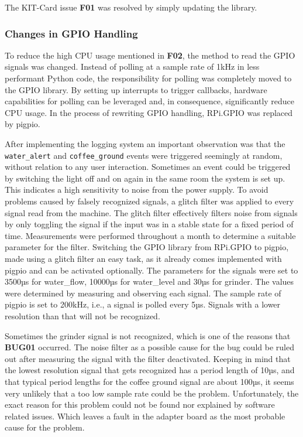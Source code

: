 \documentclass[12pt]{article}
\begin{document}
The KIT-Card issue \textbf{F01} was resolved by simply updating the library.


\subsubsection{Changes in GPIO Handling}
\label{sec:cpu-usage}
To reduce the high CPU usage mentioned in \textbf{F02},
the method to read the GPIO signals was changed.
Instead of polling at a sample rate of 1kHz in less performant Python code,
the responsibility for polling was completely moved to the GPIO library.
By setting up interrupts to trigger callbacks,
hardware capabilities for polling can be leveraged and, in consequence, significantly reduce CPU usage.
In the process of rewriting GPIO handling, RPi.GPIO was replaced by pigpio.

After implementing the logging system an important observation was that the \\
\texttt{water\_alert} and \texttt{coffee\_ground} events were triggered seemingly at random, without relation to any user interaction.
Sometimes an event could be triggered by switching the light off and on again in the same room the system is set up.
This indicates a high sensitivity to noise from the power supply.
To avoid problems caused by falsely recognized signals, a glitch filter was applied to every signal read from the machine.
The glitch filter effectively filters noise from signals by only toggling the signal if the input was in a stable state for a fixed period of time.
Measurements were performed throughout a month to determine a suitable parameter for the filter.
Switching the GPIO library from RPi.GPIO to pigpio, made using a glitch filter an easy task, as it already comes implemented with pigpio and can be activated optionally.
The parameters for the signals were set to 3500µs for water\_flow, 10000µs for water\_level and 30µs for grinder.
The values were determined by measuring and observing each signal.
The sample rate of pigpio is set to 200kHz, i.e., a signal is polled every 5µs.
Signals with a lower resolution than that will not be recognized.

\label{sec:grinder}
Sometimes the grinder signal is not recognized, which is one of the reasons that \textbf{BUG01} occurred.
The noise filter as a possible cause for the bug could be ruled out after measuring the signal with the filter deactivated.
Keeping in mind that the lowest resolution signal that gets recognized has a period length of 10µs,
and that typical period lengths for the coffee ground signal are about 100µs, it seems very unlikely that a too low sample rate could be the problem. 
Unfortunately, the exact reason for this problem could not be found 
nor explained by software related issues.
Which leaves a fault in the adapter board as the most probable cause for the problem.
\end{document}
